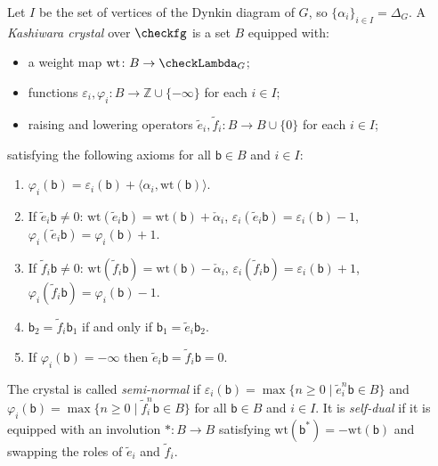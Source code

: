 \begin{definition}
  Let \( I \) be the set of vertices of the Dynkin diagram of \( G \), so
  \( \{\alpha_i\}_{i \in I} = \Delta_G \).
  A \emph{Kashiwara crystal} over \( \checkfg \) is a set \( B \) equipped with:
  \begin{itemize}
    \item a weight map \( \mathrm{wt} \colon B \to \checkLambda_G \);
    \item functions
          \( \varepsilon_i, \varphi_i \colon B \to \mathbb{Z} \cup \{-\infty\} \)
          for each \( i \in I \);
    \item raising and lowering operators
          \( \tilde{e}_i, \tilde{f}_i \colon B \to B \cup \{0\} \)
          for each \( i \in I \);
  \end{itemize}
  satisfying the following axioms for all \( \mathsf{b} \in B \) and \( i \in I \):
  \begin{enumerate}
    \item \( \varphi_i(\mathsf{b})
             = \varepsilon_i(\mathsf{b}) + \langle \alpha_i, \mathrm{wt}(\mathsf{b})\rangle \).
    \item If \( \tilde{e}_i \mathsf{b} \ne 0 \):
          \( \mathrm{wt}(\tilde{e}_i \mathsf{b}) = \mathrm{wt}(\mathsf{b}) + \check{\alpha}_i \),
          \( \varepsilon_i(\tilde{e}_i \mathsf{b}) = \varepsilon_i(\mathsf{b}) - 1 \),
          \( \varphi_i(\tilde{e}_i \mathsf{b}) = \varphi_i(\mathsf{b}) + 1 \).
    \item If \( \tilde{f}_i \mathsf{b} \ne 0 \):
          \( \mathrm{wt}(\tilde{f}_i \mathsf{b}) = \mathrm{wt}(\mathsf{b}) - \check{\alpha}_i \),
          \( \varepsilon_i(\tilde{f}_i \mathsf{b}) = \varepsilon_i(\mathsf{b}) + 1 \),
          \( \varphi_i(\tilde{f}_i \mathsf{b}) = \varphi_i(\mathsf{b}) - 1 \).
    \item \( \mathsf{b}_2 = \tilde{f}_i \mathsf{b}_1 \) if and only if
          \( \mathsf{b}_1 = \tilde{e}_i \mathsf{b}_2 \).
    \item If \( \varphi_i(\mathsf{b}) = -\infty \) then
          \( \tilde{e}_i \mathsf{b} = \tilde{f}_i \mathsf{b} = 0 \).
  \end{enumerate}
  The crystal is called \emph{semi-normal} if
  \( \varepsilon_i(\mathsf{b}) = \max\{n \ge 0 \mid \tilde{e}_i^n \mathsf{b} \in B\} \)
  and
  \( \varphi_i(\mathsf{b}) = \max\{n \ge 0 \mid \tilde{f}_i^n \mathsf{b} \in B\} \)
  for all \( \mathsf{b} \in B \) and \( i \in I \).
  It is \emph{self-dual} if it is equipped with an involution
  \( * \colon B \to B \) satisfying
  \( \mathrm{wt}(\mathsf{b}^*) = -\mathrm{wt}(\mathsf{b}) \) and
  swapping the roles of \( \tilde{e}_i \) and \( \tilde{f}_i \).
\end{definition}

